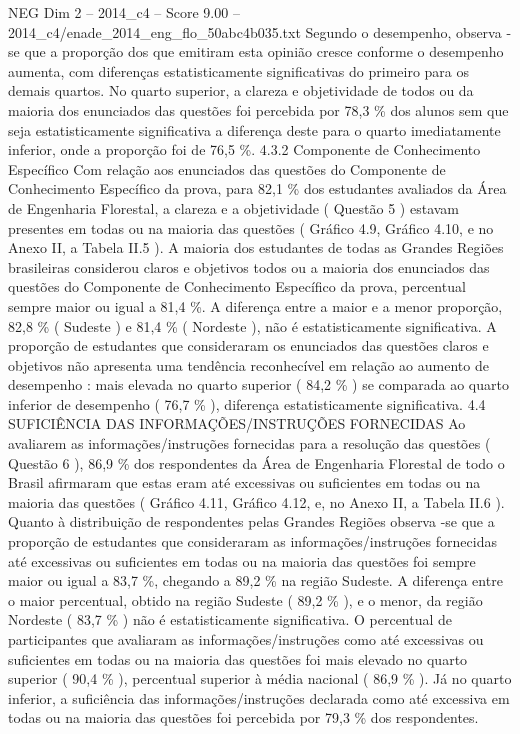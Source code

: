 \begin{textsample}{NEG Dim 2 – 2014\_c4 – Score 9.00 – 2014\_c4/enade\_2014\_eng\_flo\_50abc4b035.txt}
Segundo o desempenho, observa -se que a proporção dos que emitiram esta opinião cresce conforme o desempenho aumenta, com diferenças estatisticamente significativas do primeiro para os demais quartos.
No quarto superior, a clareza e objetividade de todos ou da maioria dos enunciados das questões foi percebida por 78,3 \% dos alunos sem que seja estatisticamente significativa a diferença deste para o quarto imediatamente inferior, onde a proporção foi de 76,5 \%. 4.3.2 Componente de Conhecimento Específico Com relação aos enunciados das questões do Componente de Conhecimento Específico da prova, para 82,1 \% dos estudantes avaliados da Área de Engenharia Florestal, a clareza e a objetividade ( Questão 5 ) estavam presentes em todas ou na maioria das questões ( Gráfico 4.9, Gráfico 4.10, e no Anexo II, a Tabela II.5 ).
A maioria dos estudantes de todas as Grandes Regiões brasileiras considerou claros e objetivos todos ou a maioria dos enunciados das questões do Componente de Conhecimento Específico da prova, percentual sempre maior ou igual a 81,4 \%.
A diferença entre a maior e a menor proporção, 82,8 \% ( Sudeste ) e 81,4 \% ( Nordeste ), não é estatisticamente significativa.
A proporção de estudantes que consideraram os enunciados das questões claros e objetivos não apresenta uma tendência reconhecível em relação ao aumento de desempenho : mais elevada no quarto superior ( 84,2 \% ) se comparada ao quarto inferior de desempenho ( 76,7 \% ), diferença estatisticamente significativa. 4.4 SUFICIÊNCIA DAS INFORMAÇÕES/INSTRUÇÕES FORNECIDAS Ao avaliarem as informações/instruções fornecidas para a resolução das questões ( Questão 6 ), 86,9 \% dos respondentes da Área de Engenharia Florestal de todo o Brasil afirmaram que estas eram até excessivas ou suficientes em todas ou na maioria das questões ( Gráfico 4.11, Gráfico 4.12, e, no Anexo II, a Tabela II.6 ).
Quanto à distribuição de respondentes pelas Grandes Regiões observa -se que a proporção de estudantes que consideraram as informações/instruções fornecidas até excessivas ou suficientes em todas ou na maioria das questões foi sempre maior ou igual a 83,7 \%, chegando a 89,2 \% na região Sudeste.
A diferença entre o maior percentual, obtido na região Sudeste ( 89,2 \% ), e o menor, da região Nordeste ( 83,7 \% ) não é estatisticamente significativa.
O percentual de participantes que avaliaram as informações/instruções como até excessivas ou suficientes em todas ou na maioria das questões foi mais elevado no quarto superior ( 90,4 \% ), percentual superior à média nacional ( 86,9 \% ).
Já no quarto inferior, a suficiência das informações/instruções declarada como até excessiva em todas ou na maioria das questões foi percebida por 79,3 \% dos respondentes.

\end{textsample}

